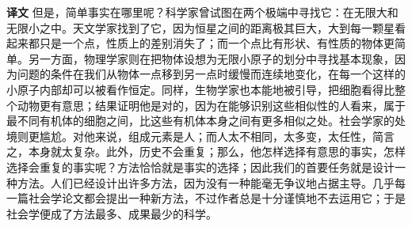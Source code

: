 \documentclass[UTF8]{ctexart}
\newenvironment{zhtranslation}{\par\noindent\textbf{译文}\quad\ignorespaces}{\par\vspace{0.35em}}
\begin{document}
\begin{zhtranslation}
但是，简单事实在哪里呢？科学家曾试图在两个极端中寻找它：在无限大和无限小之中。天文学家找到了它，因为恒星之间的距离极其巨大，大到每一颗星看起来都只是一个点，性质上的差别消失了；而一个点比有形状、有性质的物体更简单。另一方面，物理学家则在把物体设想为无限小原子的划分中寻找基本现象，因为问题的条件在我们从物体一点移到另一点时缓慢而连续地变化，在每一个这样的小原子内部却可以被看作恒定。同样，生物学家也本能地被引导，把细胞看得比整个动物更有意思；结果证明他是对的，因为在能够识别这些相似性的人看来，属于最不同有机体的细胞之间，比这些有机体本身之间有更多相似之处。社会学家的处境则更尴尬。对他来说，组成元素是人；而人太不相同，太多变，太任性，简言之，本身就太复杂。此外，历史不会重复；那么，他怎样选择有意思的事实，怎样选择会重复的事实呢？方法恰恰就是事实的选择；因此我们的首要任务就是设计一种方法。人们已经设计出许多方法，因为没有一种能毫无争议地占据主导。几乎每一篇社会学论文都会提出一种新方法，不过作者总是十分谨慎地不去运用它；于是社会学便成了方法最多、成果最少的科学。\end{zhtranslation}
\end{document}
